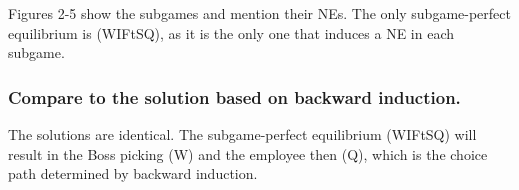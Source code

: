 Figures 2-5 show the subgames and mention their NEs. The only subgame-perfect equilibrium is (WIFtSQ), as it is the only one that induces a NE in each subgame.

\subsubsection{Compare to the solution based on backward induction.}
The solutions are identical. The subgame-perfect equilibrium (WIFtSQ) will result in the Boss picking (W) and the employee then (Q), which is the choice path determined by backward induction.